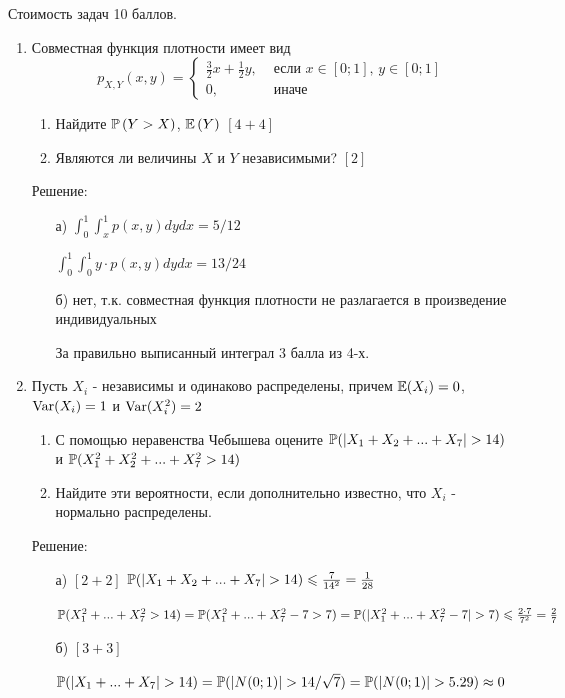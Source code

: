 \documentclass[12pt, a4paper]{article}\usepackage[]{graphicx}\usepackage[]{color}
\begin{document}
Стоимость задач 10 баллов.

\begin{enumerate}
\item Совместная функция плотности имеет вид
\[
p_{X,Y} \left(x,y\right)=
\begin{cases}
\frac{3}{2}x+\frac{1}{2}y, & \text{ если } x\in \left[0;1\right],\, y\in \left[0;1\right] \\
0, & \text{ иначе}
\end{cases}
\]
\begin{enumerate}
\item Найдите  $\P\left(Y>X\right)$,  $\E\left(Y\right)$ $[4+4]$
\item Являются ли величины $X$ и $Y$ независимыми? $[2]$
\end{enumerate}

Решение:
\begin{enumerate}
\item[а)] $\int_{0}^{1}\int_{x}^{1}p(x,y)dydx=5/12$

$\int_{0}^{1}\int_{0}^{1}y\cdot p(x,y)dydx=13/24$
\item[б)] нет, т.к. совместная функция плотности не разлагается в произведение индивидуальных

За правильно выписанный интеграл 3 балла из 4-х.
\end{enumerate}


\item Пусть $X_{i}$ - независимы и одинаково распределены, причем $\E(X_{i})=0$, $\Var(X_{i})=1$ и $\Var(X_{i}^{2})=2$
\begin{enumerate}
\item С помощью неравенства Чебышева оцените $\P(|X_{1}+X_{2}+...+X_{7}|>14)$ и $\P(X_{1}^{2}+X_{2}^{2}+...+X_{7}^{2}>14)$
\item Найдите эти вероятности, если дополнительно известно, что $X_{i}$ - нормально распределены.
\end{enumerate}

Решение:
\begin{enumerate}
\item[а)] $[2+2]$ $\P(|X_{1}+X_{2}+...+X_{7}|>14)\leq \frac{7}{14^2}=\frac{1}{28}$

$\P(X_{1}^{2}+...+X_{7}^{2}>14)=\P(X_{1}^{2}+...+X_{7}^{2}-7>7)=\P(|X_{1}^{2}+...+X_{7}^{2}-7|>7)\leq \frac{2\cdot 7}{7^2}=\frac{2}{7}$
\item[б)] $[3+3]$

$\P(|X_{1}+...+X_{7}|>14)=\P(|N(0;1)|>14/\sqrt{7})=\P(|N(0;1)|>5.29)\approx 0$


\end{enumerate}
\end{enumerate}
\end{document}
